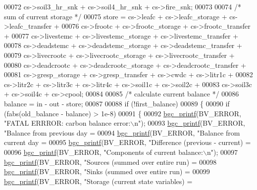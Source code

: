 \begin{DoxyCode}
{{{{{{00072         cs->soil3\_hr\_snk + cs->soil4\_hr\_snk + cs->fire\_snk; 
00073         
00074     \textcolor{comment}{/* sum of current storage */}
00075     store = cs->leafc + cs->leafc\_storage + cs->leafc\_transfer +
00076         cs->frootc + cs->frootc\_storage + cs->frootc\_transfer + 
00077         cs->livestemc + cs->livestemc\_storage + cs->livestemc\_transfer + 
00078         cs->deadstemc + cs->deadstemc\_storage + cs->deadstemc\_transfer +
00079         cs->livecrootc + cs->livecrootc\_storage + cs->livecrootc\_transfer + 
00080         cs->deadcrootc + cs->deadcrootc\_storage + cs->deadcrootc\_transfer + 
00081         cs->gresp\_storage + cs->gresp\_transfer + cs->cwdc + cs->litr1c +
00082         cs->litr2c + cs->litr3c + cs->litr4c + cs->soil1c + cs->soil2c +
00083         cs->soil3c + cs->soil4c + cs->cpool;
00084     
00085     \textcolor{comment}{/* calculate current balance */}
00086     balance = in - out - store;
00087      
00088     \textcolor{keywordflow}{if} (!first\_balance)
00089     \{
00090         \textcolor{keywordflow}{if} (fabs(old\_balance - balance) > 1e-8)
00091         \{
00092             \hyperlink{bgc__io_8c_af287cce6e2aede1ce337de9319e80d0d}{bgc\_printf}(BV\_ERROR, \textcolor{stringliteral}{"FATAL ERRROR: carbon balance error:\(\backslash\)n"});
00093             \hyperlink{bgc__io_8c_af287cce6e2aede1ce337de9319e80d0d}{bgc\_printf}(BV\_ERROR, \textcolor{stringliteral}{"Balance from previous day = %
00094             \hyperlink{bgc__io_8c_af287cce6e2aede1ce337de9319e80d0d}{bgc\_printf}(BV\_ERROR, \textcolor{stringliteral}{"Balance from current day  = %
00095             \hyperlink{bgc__io_8c_af287cce6e2aede1ce337de9319e80d0d}{bgc\_printf}(BV\_ERROR, \textcolor{stringliteral}{"Difference (previous - current) = %
00096             \hyperlink{bgc__io_8c_af287cce6e2aede1ce337de9319e80d0d}{bgc\_printf}(BV\_ERROR, \textcolor{stringliteral}{"Components of current balance:\(\backslash\)n"});
00097             \hyperlink{bgc__io_8c_af287cce6e2aede1ce337de9319e80d0d}{bgc\_printf}(BV\_ERROR, \textcolor{stringliteral}{"Sources (summed over entire run)  = %
00098             \hyperlink{bgc__io_8c_af287cce6e2aede1ce337de9319e80d0d}{bgc\_printf}(BV\_ERROR, \textcolor{stringliteral}{"Sinks   (summed over entire run)  = %
00099             \hyperlink{bgc__io_8c_af287cce6e2aede1ce337de9319e80d0d}{bgc\_printf}(BV\_ERROR, \textcolor{stringliteral}{"Storage (current state variables) = %
}}}}}}}}}}}}
\end{DoxyCode}
